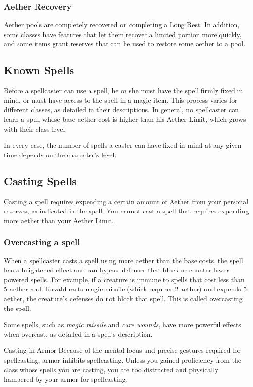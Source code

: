 \subsubsection{Aether Recovery}
Aether pools are completely recovered on completing a Long Rest. In addition, some classes have features that let them recover a limited portion more quickly, and some items grant reserves that can be used to restore some aether to a pool.

\subsection{Known Spells}

Before a spellcaster can use a spell, he or she must have the spell firmly fixed in mind, or must have access to the spell in a magic item. This process varies for different classes, as detailed in their descriptions. In general, no spellcaster can learn a spell whose base aether cost is higher than his Aether Limit, which grows with their class level. 

In every case, the number of spells a caster can have fixed in mind at any given time depends on the character's level.

\subsection{Casting Spells}
Casting a spell requires expending a certain amount of Aether from your personal reserves, as indicated in the spell. You cannot cast a spell that requires expending more aether than your Aether Limit. 

\subsubsection{Overcasting a spell}

When a spellcaster casts a spell using more aether than the base costs, the spell has a heightened effect and can bypass defenses that block or counter lower-powered spells. For example, if a creature is immune to spells that cost less than 5 aether and Torvald casts magic missile (which requires 2 aether) and expends 5 aether, the creature's defenses do not block that spell. This is called overcasting the spell.

Some spells, such as \textit{magic missile} and \textit{cure wounds}, have more powerful effects when overcast, as detailed in a spell's description.

\begin{DndSidebar}{Casting in Armor}
    Because of the mental focus and precise gestures required for spellcasting, armor inhibits spellcasting. Unless you gained proficiency from the class whose spells you are casting, you are too distracted and physically hampered by your armor for spellcasting.
\end{DndSidebar}


